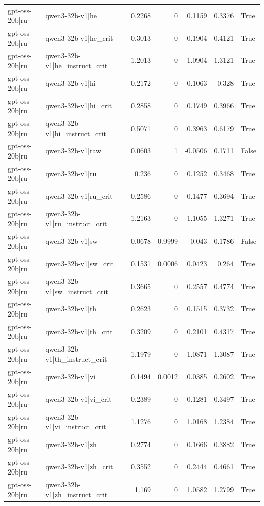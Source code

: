 \begin{table}
\begin{tabular}{l l r r r r l}
gpt-oss-20b|ru & qwen3-32b-v1|he & 0.2268 & 0 & 0.1159 & 0.3376 & True \\
gpt-oss-20b|ru & qwen3-32b-v1|he_crit & 0.3013 & 0 & 0.1904 & 0.4121 & True \\
gpt-oss-20b|ru & qwen3-32b-v1|he_instruct_crit & 1.2013 & 0 & 1.0904 & 1.3121 & True \\
gpt-oss-20b|ru & qwen3-32b-v1|hi & 0.2172 & 0 & 0.1063 & 0.328 & True \\
gpt-oss-20b|ru & qwen3-32b-v1|hi_crit & 0.2858 & 0 & 0.1749 & 0.3966 & True \\
gpt-oss-20b|ru & qwen3-32b-v1|hi_instruct_crit & 0.5071 & 0 & 0.3963 & 0.6179 & True \\
gpt-oss-20b|ru & qwen3-32b-v1|raw & 0.0603 & 1 & -0.0506 & 0.1711 & False \\
gpt-oss-20b|ru & qwen3-32b-v1|ru & 0.236 & 0 & 0.1252 & 0.3468 & True \\
gpt-oss-20b|ru & qwen3-32b-v1|ru_crit & 0.2586 & 0 & 0.1477 & 0.3694 & True \\
gpt-oss-20b|ru & qwen3-32b-v1|ru_instruct_crit & 1.2163 & 0 & 1.1055 & 1.3271 & True \\
gpt-oss-20b|ru & qwen3-32b-v1|sw & 0.0678 & 0.9999 & -0.043 & 0.1786 & False \\
gpt-oss-20b|ru & qwen3-32b-v1|sw_crit & 0.1531 & 0.0006 & 0.0423 & 0.264 & True \\
gpt-oss-20b|ru & qwen3-32b-v1|sw_instruct_crit & 0.3665 & 0 & 0.2557 & 0.4774 & True \\
gpt-oss-20b|ru & qwen3-32b-v1|th & 0.2623 & 0 & 0.1515 & 0.3732 & True \\
gpt-oss-20b|ru & qwen3-32b-v1|th_crit & 0.3209 & 0 & 0.2101 & 0.4317 & True \\
gpt-oss-20b|ru & qwen3-32b-v1|th_instruct_crit & 1.1979 & 0 & 1.0871 & 1.3087 & True \\
gpt-oss-20b|ru & qwen3-32b-v1|vi & 0.1494 & 0.0012 & 0.0385 & 0.2602 & True \\
gpt-oss-20b|ru & qwen3-32b-v1|vi_crit & 0.2389 & 0 & 0.1281 & 0.3497 & True \\
gpt-oss-20b|ru & qwen3-32b-v1|vi_instruct_crit & 1.1276 & 0 & 1.0168 & 1.2384 & True \\
gpt-oss-20b|ru & qwen3-32b-v1|zh & 0.2774 & 0 & 0.1666 & 0.3882 & True \\
gpt-oss-20b|ru & qwen3-32b-v1|zh_crit & 0.3552 & 0 & 0.2444 & 0.4661 & True \\
gpt-oss-20b|ru & qwen3-32b-v1|zh_instruct_crit & 1.169 & 0 & 1.0582 & 1.2799 & True \\

\end{tabular}
\end{table}
